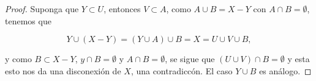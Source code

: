 \documentclass[11pt]{article}
\begin{document}
\begin{enumerate}
\begin{proof}
        Suponga que $Y\subset U$, entonces $V\subset A$, como $A\cup B=X-Y$ con $A\cap B=\emptyset$, tenemos que 

        $$Y\cup (X-Y)=(Y\cup A)\cup B=X=U\cup V\cup B,$$


        y como $B\subset X-Y$, $y\cap B=\emptyset$ y $A\cap B=\emptyset$, se sigue que $(U\cup V)\cap B=\emptyset$ y esta esto nos da una disconexión de $X$, una contradiccón. El caso $Y\cup B$ es análogo.
    \end{proof}

\end{enumerate}
\end{document}
